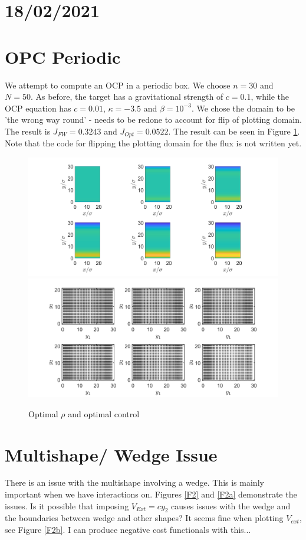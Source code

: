 \documentclass[11pt, a4paper]{article}
\theoremstyle{definition}
\begin{document}
\section*{18/02/2021}	
	
	
	\section*{OPC Periodic}
    We attempt to compute an OCP in a periodic box. We choose $n = 30$ and $N = 50$. As before, the target has a gravitational strength of $c = 0.1$, while the OCP equation has $c = 0.01$, $\kappa = -3.5$ and $\beta = 10^{-3}$. We chose the domain to be 'the wrong way round' - needs to be redone to account for flip of plotting domain.
    The result is $J_{FW} = 0.3243$ and $J_{Opt} = 0.0522$. The result can be seen in Figure \ref{F1}. Note that the code for flipping the plotting domain for the flux is not written yet.
	
		\begin{figure}[h]
			\centering
			\includegraphics[scale=0.35]{rho1.png}
			\includegraphics[scale=0.35]{control1.png}
			\caption{Optimal $\rho$ and optimal control} 
			\label{F1}
		\end{figure}
	
	
	\section{Multishape/ Wedge Issue}
	There is an issue with the multishape involving a wedge. This is mainly important when we have interactions on. Figures \ref{F2} and \ref{F2a} demonstrate the issues. Is it possible that imposing $V_{Ext} = c y_2$ causes issues with the wedge and the boundaries between wedge and other shapes? It seems fine when plotting $V_{ext}$, see Figure \ref{F2b}.
	I can produce negative cost functionals with this... 
\end{document}
